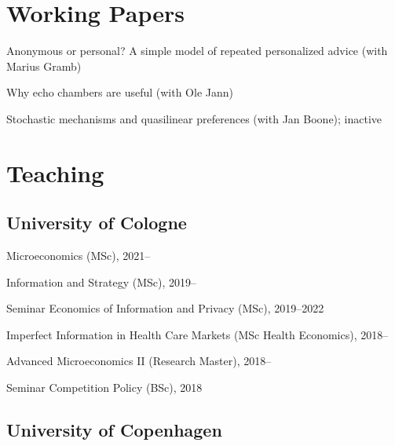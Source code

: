 \documentclass[a4paper]{article}
\renewenvironment{itemize}{
  \begin{list}{}{
    \setlength{\leftmargin}{1.5em}
  }
}{
  \end{list}
}
\begin{document}
\section*{Working Papers}

\begin{itemize}
\item Anonymous or personal? A simple model of repeated personalized advice (with Marius Gramb)
  
\item Why echo chambers are useful (with Ole Jann)
  
\item Stochastic mechanisms and quasilinear preferences (with Jan Boone); inactive

\end{itemize}




\section*{Teaching} 

\subsection*{University of Cologne}
\begin{itemize}
\item Microeconomics (MSc), 2021--
\item Information and Strategy (MSc), 2019--
\item Seminar Economics of Information and Privacy (MSc), 2019--2022
\item Imperfect Information in Health Care Markets (MSc Health Economics), 2018--
\item Advanced Microeconomics II (Research Master), 2018--
\item Seminar Competition Policy (BSc), 2018
\end{itemize}

\subsection*{University of Copenhagen}
\end{document}
